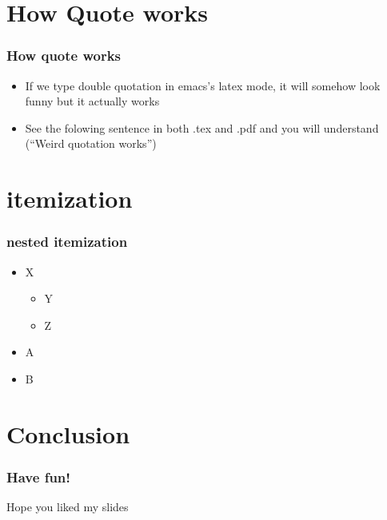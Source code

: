 \documentclass{beamer}
\begin{document}
\section*{How Quote works}
\begin{frame}
\frametitle{How quote works}
\begin{itemize}
\item If we type double quotation in emacs's latex mode, it will somehow look
  funny but it actually works
\item See the folowing sentence in both .tex and .pdf and you will understand
  (``Weird quotation works'')
\end{itemize}
\end{frame}

\section*{itemization}
\begin{frame}[fragile]
\frametitle{nested itemization}
\begin{itemize}
\item X
\begin{itemize}
\item Y
\item Z
\end{itemize}
\item A
\item B
\end{itemize}
\end{frame}


\section*{Conclusion}
\begin{frame}
\frametitle{Have fun!}
Hope you liked my slides
\end{frame}
\end{document}
